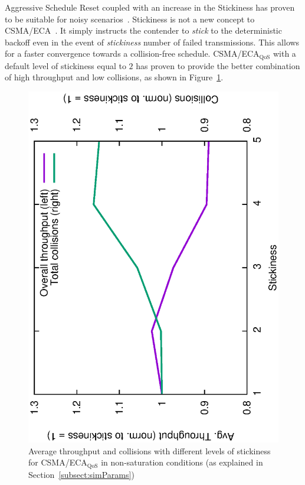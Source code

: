 Aggressive Schedule Reset coupled with an increase in the Stickiness has proven to be suitable for noisy scenarios~\cite{sanabria2014high}. Stickiness is not a new concept to CSMA/ECA~\cite{barcelo2011tcf}. It simply instructs the contender to \emph{stick} to the deterministic backoff even in the event of \emph{stickiness} number of failed transmissions. This allows for a faster convergence towards a collision-free schedule. CSMA/ECA$_{\text{QoS}}$ with a default level of stickiness equal to $2$ has proven to provide the better combination of high throughput and low collisions, as shown in Figure~\ref{fig:stickEv-throughput-overallOnly}. 

\begin{figure}[tb]
	\centering
		\includegraphics[width=0.7\linewidth, angle=-90]{figures/stickEv-throughput-overallOnly.eps}
		\caption{Average throughput and collisions with different levels of stickiness for CSMA/ECA$_{\text{QoS}}$ in non-saturation conditions (as explained in Section~\ref{subsect:simParams})}
		\label{fig:stickEv-throughput-overallOnly}
	\end{figure}


